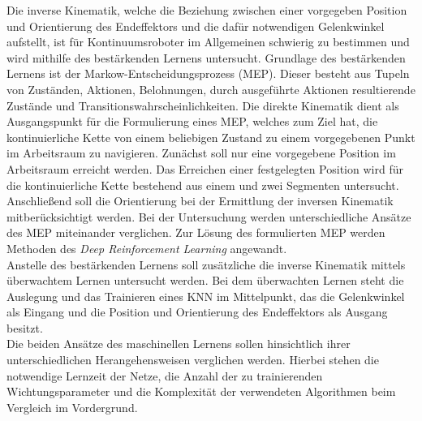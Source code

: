 \documentclass[11pt,a4paper]{article}
\begin{document}
Die inverse Kinematik, welche die Beziehung zwischen einer vorgegeben Position und Orientierung des Endeffektors und die dafür notwendigen Gelenkwinkel aufstellt, ist für Kontinuumsroboter im Allgemeinen schwierig zu bestimmen und wird mithilfe des bestärkenden Lernens untersucht. Grundlage des bestärkenden Lernens ist der Markow-Entscheidungsprozess (MEP). Dieser besteht aus Tupeln von Zuständen, Aktionen, Belohnungen, durch ausgeführte Aktionen resultierende Zustände und Transitionswahrscheinlichkeiten. 
Die direkte Kinematik dient als Ausgangspunkt für die Formulierung eines MEP, welches zum Ziel hat, die kontinuierliche Kette von einem beliebigen Zustand zu einem vorgegebenen Punkt im Arbeitsraum zu navigieren. Zunächst soll nur eine vorgegebene Position im Arbeitsraum erreicht werden. Das Erreichen einer festgelegten Position wird für die kontinuierliche Kette bestehend aus einem und zwei Segmenten untersucht. Anschließend soll die Orientierung bei der Ermittlung der inversen Kinematik mitberücksichtigt werden. Bei der Untersuchung werden unterschiedliche Ansätze des MEP miteinander verglichen. Zur Lösung des formulierten MEP werden Methoden des \textit{Deep Reinforcement Learning} angewandt. \\

Anstelle des bestärkenden Lernens soll zusätzliche die inverse Kinematik mittels überwachtem Lernen untersucht werden. Bei dem überwachten Lernen steht die Auslegung und das Trainieren eines KNN im Mittelpunkt, das die Gelenkwinkel als Eingang und die Position und Orientierung des Endeffektors als Ausgang besitzt. \\

Die beiden Ansätze des maschinellen Lernens sollen hinsichtlich ihrer unterschiedlichen Herangehensweisen verglichen werden. Hierbei stehen die notwendige Lernzeit der Netze, die Anzahl der zu trainierenden Wichtungsparameter und die Komplexität der verwendeten Algorithmen beim Vergleich im Vordergrund.
\end{document}
